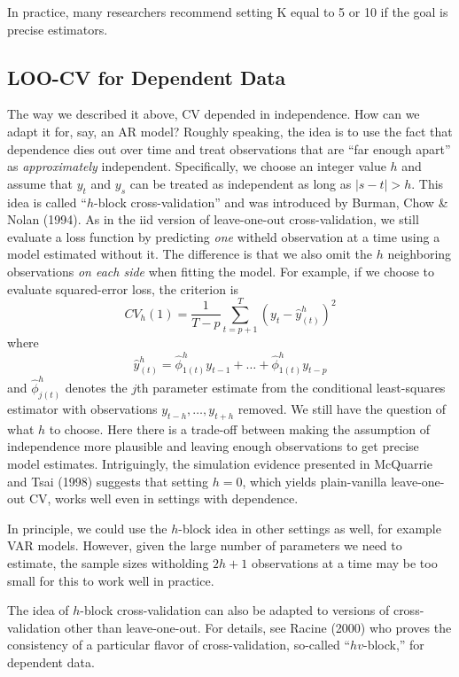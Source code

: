 \documentclass[12pt]{article}
\theoremstyle{definition}
\begin{document}
In practice, many researchers recommend setting K equal to 5 or 10 if the goal is precise estimators.


\subsection{LOO-CV for Dependent Data}
The way we described it above, CV depended in independence. How can we adapt it for, say, an AR model? Roughly speaking, the idea is to use the fact that dependence dies out over time and treat observations that are ``far enough apart'' as \emph{approximately} independent. Specifically, we choose an integer value $h$ and assume that $y_t$ and $y_s$ can be treated as independent as long as $|s - t|>h$. This idea is called ``$h$-block cross-validation'' and was introduced by Burman, Chow \& Nolan (1994). As in the iid version of leave-one-out cross-validation, we still evaluate a loss function by predicting \emph{one} witheld observation at a time using a model estimated without it. The difference is that we also omit the $h$ neighboring observations \emph{on each side} when fitting the model. For example, if we choose to evaluate squared-error loss, the criterion is
	$$CV_h(1) = \frac{1}{T-p}\sum_{t = p+1}^T \left(y_t - \hat{y}_{(t)}^h\right)^2$$
where 
$$\hat{y}^h_{(t)} = \hat{\phi}^h_{1(t)} y_{t-1} + \hdots + \hat{\phi}^h_{1(t)}y_{t-p}$$
and $\hat{\phi}^h_{j(t)}$ denotes the $j$th parameter estimate from the conditional least-squares estimator with observations $y_{t-h}, \hdots,  y_{t+h}$ removed. We still have the question of what $h$ to choose. Here there is a trade-off between making the assumption of independence more plausible and leaving enough observations to get precise model estimates. Intriguingly, the simulation evidence presented in McQuarrie and Tsai (1998) suggests that setting $h=0$, which yields plain-vanilla leave-one-out CV, works well even in settings with dependence.

In principle, we could use the $h$-block idea in other settings as well, for example VAR models. However, given the large number of parameters we need to estimate, the sample sizes witholding $2h+1$ observations at a time may be too small for this to work well in practice.


The idea of $h$-block cross-validation can also be adapted to versions of cross-validation other than leave-one-out. For details, see Racine (2000) who proves the consistency of a particular flavor of cross-validation, so-called ``$hv$-block,'' for dependent data.
\end{document}
